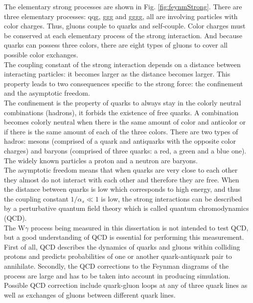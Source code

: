 The elementary strong processes are shown in Fig. \ref{fig:feynmStrong}. There are three elementary processes: qqg, ggg and gggg, all are involving particles with color charges. Thus, gluons couple to quarks and self-couple. Color charges must be conserved at each elementary process of the strong interaction. And because quarks can possess three colors, there are eight types of gluons to cover all possible color exchanges. \\

The coupling constant of the strong interaction depends on a distance between interacting particles: it becomes larger as the distance becomes larger. This property leads to two consequences specific to the strong force: the confinement and the asymptotic freedom.\\

The confinement is the property of quarks to always stay in the colorly neutral combinations (hadrons), it forbids the existence of free quarks. A combination becomes colorly neutral when there is the same amount of color and anticolor or if there is the same amount of each of the three colors.  There are two types of hadros: mesons (comprised of a quark and antiquarks with the opposite color charges) and baryons (comprised of three quarks: a red, a green and a blue one). The widely known particles a proton and a neutron are baryons.\\

The asymptotic freedom means that when quarks are very close to each other they almost do not interact with each other and therefore they are free. When the distance between quarks is low which corresponds to high energy, and thus the coupling constant $1/\alpha_s \ll 1$ is low, the strong interactions can be described by a perturbative quantum field theory which is called quantum chromodynamics (QCD).\\

The W$\gamma$ process being measured in this dissertation is not intended to test QCD, but a good understanding of QCD is essential for performing this measurement. First of all, QCD describes the dynamics of quarks and gluons within colliding protons and predicts probabilities of one or another quark-antiquark pair to annihilate. Secondly, the QCD corrections to the Feynman diagrams of the process are large and has to be taken into account in producing simulation. Possible QCD correction include quark-gluon loops at any of three quark lines as well as exchanges of gluons between different quark lines.\\
 
